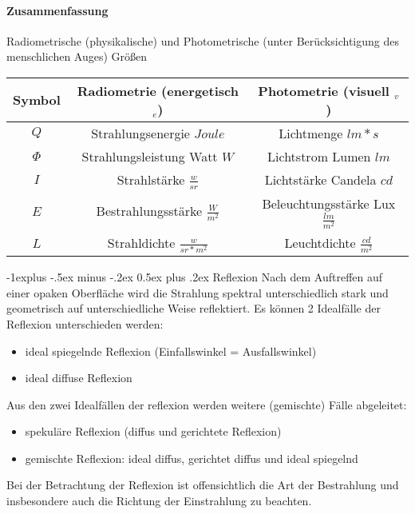 \documentclass[10pt,landscape]{article}
\makeatletter
\renewcommand{\subsection}{\@startsection{subsection}{2}{0mm}%
                                {-1explus -.5ex minus -.2ex}%
                                {0.5ex plus .2ex}%
                                {\normalfont\normalsize\bfseries}}
\makeatother
\begin{document}
\begin{multicols}{3}
\paragraph{Zusammenfassung}
Radiometrische (physikalische) und Photometrische (unter Berücksichtigung des menschlichen Auges) Größen

\begin{tabular}{ c | c | c }
  Symbol & Radiometrie (energetisch $_e$)     & Photometrie (visuell $_v$ )             \\ \hline
  $Q$    & Strahlungsenergie $Joule$          & Lichtmenge $lm*s$                       \\
  $\Phi$ & Strahlungsleistung Watt $W$        & Lichtstrom Lumen $lm$                   \\
  $I$    & Strahlstärke $\frac{w}{sr}$        & Lichtstärke Candela $cd$                \\
  $E$    & Bestrahlungsstärke $\frac{W}{m^2}$ & Beleuchtungsstärke Lux $\frac{lm}{m^2}$ \\
  $L$    & Strahldichte $\frac{w}{sr*m^2}$    & Leuchtdichte $\frac{cd}{m^2}$           \\
\end{tabular}


\subsection{ Reflexion}
Nach dem Auftreffen auf einer opaken Oberfläche wird die Strahlung spektral
unterschiedlich stark und geometrisch auf unterschiedliche Weise reflektiert. Es
können 2 Idealfälle der Reflexion unterschieden werden:
\begin{itemize}
  \item ideal spiegelnde Reflexion (Einfallswinkel = Ausfallswinkel)
  \item ideal diffuse Reflexion
\end{itemize}

Aus den zwei Idealfällen der reflexion werden weitere (gemischte) Fälle abgeleitet:
\begin{itemize}
  \item spekuläre Reflexion (diffus und gerichtete Reflexion)
  \item gemischte Reflexion: ideal diffus, gerichtet diffus und ideal spiegelnd
\end{itemize}

Bei der Betrachtung der Reflexion ist offensichtlich die Art der Bestrahlung und
insbesondere auch die Richtung der Einstrahlung zu beachten.


\end{multicols}
\end{document}
